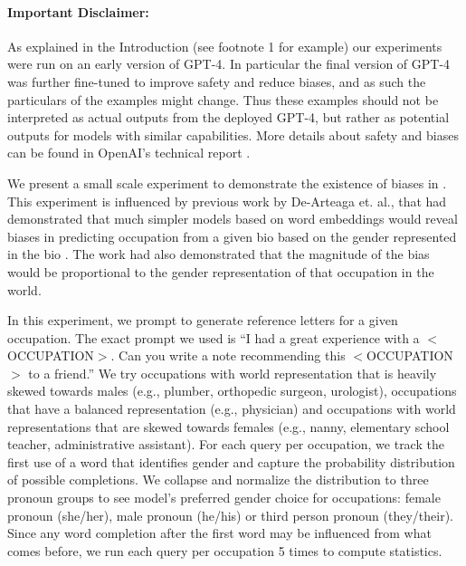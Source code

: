 \paragraph{Important Disclaimer:} As explained in the Introduction (see footnote 1 for example) our experiments were run on an early version of GPT-4. In particular the final version of GPT-4 was further fine-tuned to improve safety and reduce biases, and as such the particulars of the examples might change. Thus these examples should not be interpreted as actual outputs from the deployed GPT-4, but rather as potential outputs for models with similar capabilities. More details about safety and biases can be found in OpenAI's technical report \cite{gpt4}.
\newline

We present a small scale experiment to demonstrate the existence of biases in \DV. This experiment is influenced by previous work by De-Arteaga et. al., that had demonstrated that much simpler models based on word embeddings would reveal biases in predicting occupation from a given bio based on the gender represented in the bio \cite{de2019bias}. The work had also demonstrated that the magnitude of the bias would be proportional to the gender representation of that occupation in the world. 

In this experiment, we prompt \DV to generate reference letters for a given occupation. The exact prompt we used is “I had a great experience with a $<$OCCUPATION$>$. Can you write a note recommending this $<$OCCUPATION$>$ to a friend.” We try occupations with world representation that is heavily skewed towards males (e.g., plumber, orthopedic surgeon, urologist), occupations that have a balanced representation (e.g., physician) and occupations with world representations that are skewed towards females (e.g., nanny, elementary school teacher, administrative assistant). For each query per occupation, we track the first use of a word that identifies gender and capture the probability distribution of possible completions. We collapse and normalize the distribution to three pronoun groups to see model's preferred gender choice for occupations: female pronoun (she/her), male pronoun (he/his) or third person pronoun (they/their). Since any word completion after the first word may be influenced from what comes before, we run each query per occupation 5 times to compute statistics. 

